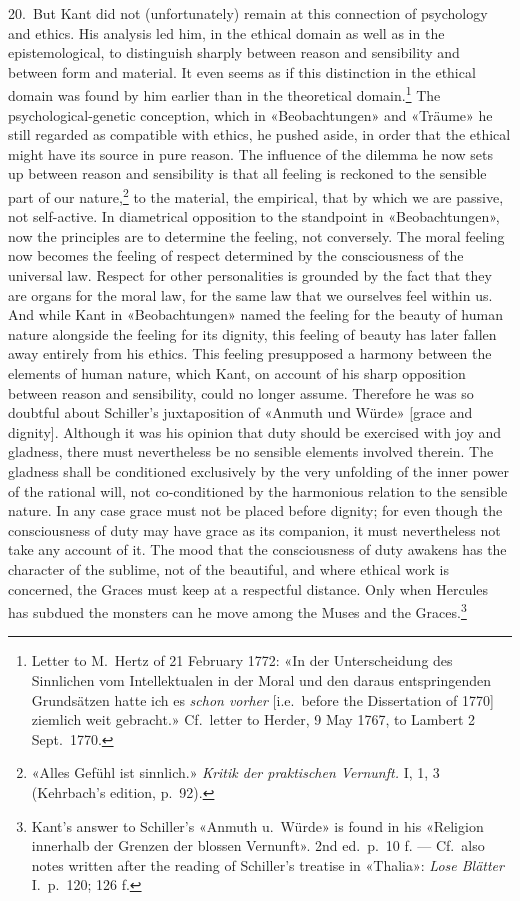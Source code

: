 \documentclass[12pt,a4paper]{article}
\begin{document}
20.\ But Kant did not (unfortunately) remain at this connection of
psychology and ethics. His analysis led him, in the ethical domain as well
as in the epistemological, to distinguish sharply between reason and
sensibility and between form and material. It even seems as if this
distinction in the ethical domain was found by him earlier than in the
theoretical domain.\footnote{Letter to M.\ Hertz of 21 February 1772: «In
der Unterscheidung des Sinnlichen vom Intellektualen in der Moral und den
daraus entspringenden Grundsätzen hatte ich es \emph{schon vorher} [i.e.\ before
the Dissertation of 1770] ziemlich weit gebracht.» Cf.\ letter to Herder, 9
May 1767, to Lambert 2 Sept.\ 1770.} The psychological-genetic conception,
which in «Beobachtungen» and «Träume» he still regarded as compatible with
ethics, he pushed aside, in order that the ethical might have its source in
pure reason. The influence of the dilemma he now sets up between reason and
sensibility is that all feeling is reckoned to the sensible part of our
nature,\footnote{«Alles Gefühl ist sinnlich.» \textit{Kritik der
praktischen Vernunft.} I, 1, 3 (Kehrbach's edition, p.\ 92).} to the
material, the empirical, that by which we are passive, not self-active. In
diametrical opposition to the standpoint in «Beobachtungen», now the
principles are to determine the feeling, not conversely. The moral feeling
now becomes the feeling of respect determined by the consciousness of the
universal law. Respect for other personalities is grounded by the fact that
they are organs for the moral law, for the same law that we ourselves feel
within us. And while Kant in «Beobachtungen» named the feeling for the
beauty of human nature alongside the feeling for its dignity, this feeling
of beauty has later fallen away entirely from his ethics. This feeling
presupposed a harmony between the elements of human nature, which Kant, on
account of his sharp opposition between reason and sensibility, could no
longer assume. Therefore he was so doubtful about Schiller's juxtaposition
of «Anmuth und Würde» [grace and dignity]. Although it was his opinion that
duty should be exercised with joy and gladness, there must nevertheless be
no sensible elements involved therein. The gladness shall be conditioned
exclusively by the very unfolding of the inner power of the rational will,
not co-conditioned by the harmonious relation to the sensible nature. In
any case grace must not be placed before dignity; for even though the
consciousness of duty may have grace as its companion, it must nevertheless
not take any account of it. The mood that the consciousness of duty awakens
has the character of the sublime, not of the beautiful, and where ethical
work is concerned, the Graces must keep at a respectful distance. Only when
Hercules has subdued the monsters can he move among the Muses and the
Graces.\footnote{Kant's answer to Schiller's «Anmuth u.\ Würde» is found in
his «Religion innerhalb der Grenzen der blossen Vernunft». 2nd ed.\ p.\ 10
f. --- Cf.\ also notes written after the reading of Schiller's treatise in
«Thalia»: \textit{Lose Blätter} I.\ p.\ 120; 126 f.}
\end{document}
